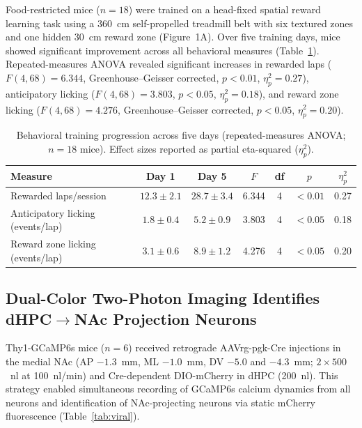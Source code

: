 \documentclass[11pt]{article}
\begin{document}
Food-restricted mice ($n = 18$) were trained on a head-fixed spatial reward learning task using a 360~cm self-propelled treadmill belt with six textured zones and one hidden 30~cm reward zone (Figure~1A). Over five training days, mice showed significant improvement across all behavioral measures (Table~\ref{tab:training}). Repeated-measures ANOVA revealed significant increases in rewarded laps ($F(4, 68) = 6.344$, Greenhouse--Geisser corrected, $p < 0.01$, $\eta^2_p = 0.27$), anticipatory licking ($F(4, 68) = 3.803$, $p < 0.05$, $\eta^2_p = 0.18$), and reward zone licking ($F(4, 68) = 4.276$, Greenhouse--Geisser corrected, $p < 0.05$, $\eta^2_p = 0.20$).

\begin{table}[htbp]
\centering
\caption{Behavioral training progression across five days (repeated-measures ANOVA; $n = 18$ mice). Effect sizes reported as partial eta-squared ($\eta^2_p$).}
\label{tab:training}
\begin{tabular}{lcccccc}
\toprule
\textbf{Measure} & \textbf{Day 1} & \textbf{Day 5} & \textbf{$F$} & \textbf{df} & \textbf{$p$} & \textbf{$\eta^2_p$} \\
\midrule
Rewarded laps/session & $12.3 \pm 2.1$ & $28.7 \pm 3.4$ & 6.344 & 4 & $<0.01$ & 0.27 \\
Anticipatory licking (events/lap) & $1.8 \pm 0.4$ & $5.2 \pm 0.9$ & 3.803 & 4 & $<0.05$ & 0.18 \\
Reward zone licking (events/lap) & $3.1 \pm 0.6$ & $8.9 \pm 1.2$ & 4.276 & 4 & $<0.05$ & 0.20 \\
\bottomrule
\end{tabular}
\end{table}

\subsection{Dual-Color Two-Photon Imaging Identifies dHPC$\to$NAc Projection Neurons}

Thy1-GCaMP6s mice ($n = 6$) received retrograde AAVrg-pgk-Cre injections in the medial NAc (AP $-1.3$~mm, ML $-1.0$~mm, DV $-5.0$ and $-4.3$~mm; $2 \times 500$~nl at 100~nl/min) and Cre-dependent DIO-mCherry in dHPC (200~nl). This strategy enabled simultaneous recording of GCaMP6s calcium dynamics from all neurons and identification of NAc-projecting neurons via static mCherry fluorescence (Table~\ref{tab:viral}).
\end{document}
